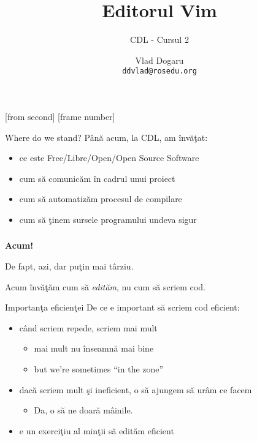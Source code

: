\documentclass{beamer}
\title{Editorul Vim}
\subtitle{CDL - Cursul 2}
\institute{ROSEdu}
\author{Vlad Dogaru \\ \texttt{ddvlad@rosedu.org}}
\begin{document}
[from second]
[frame number]

\frame{\titlepage}

\begin{frame}{Where do we stand?}
Până acum, la CDL, am învăţat:
\begin{itemize}
  \item<2-> ce este Free/Libre/Open/Open Source Software
  \item<3-> cum să comunicăm în cadrul unui proiect
  \item<4-> cum să automatizăm procesul de compilare
  \item<5-> cum să ţinem sursele programului undeva sigur
\end{itemize}
\end{frame}

\begin{frame}
  \frametitle{}
  \begin{center}
  {\Huge \bfseries Acum!}
  \vspace{2cm}

  \pause De fapt, azi, dar puţin mai târziu.

  \pause Acum învăţăm cum să \textit{edităm}, nu cum să scriem cod.
  \end{center}
\end{frame}

\begin{frame}{Importanţa eficienţei}
De ce e important să scriem cod eficient:
\begin{itemize}
  \item<2-> când scriem repede, scriem mai mult
    \begin{itemize}
    \item<3-> mai mult nu înseamnă mai bine
    \item<4-> but we're sometimes ``in the zone''
    \end{itemize}
  \item<5-> dacă scriem mult şi ineficient, o să ajungem să urâm ce facem
    \begin{itemize}
    \item<6-> Da, o să ne doară mâinile. 
    \end{itemize}
  \item<8-> e un exerciţiu al minţii să edităm eficient
\end{itemize}
\end{frame}
\end{document}
